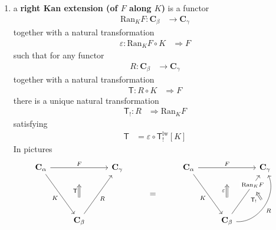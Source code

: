 \begin{enumerate}
\[\begin{tikzcd}[sep=normal]
  \\
  &
  &
  &
  =
  &
  &
  &
  \\
  &
  \mathbf{C}_{\beta}
  \arrow[swap]{uur}{L}
  &
  &
  &
  &
  \mathbf{C}_{\beta}
  \arrow["\mathrm{Lan}_{K}F" description,near end]{uur}[name=lkf]{}
  \arrow[swap,bend right=60]{uur}[name=any]{L}
  &
  \arrow[swap,from=lkf,to=any,shorten <= 10pt,shorten >= 10pt,Rightarrow]{}{\mathsf{T}_{!}}
\end{tikzcd}
\]
\item[(KE$^{\prime}$)]
a \textbf{right Kan extension (of $F$ along $K$)} is a functor
\begin{align*}
  \mathrm{Ran}_{K}F
  \colon
  \mathbf{C}_{\beta}
  &\rightarrow
  \mathbf{C}_{\gamma}
\end{align*}
together with a natural transformation
\begin{align*}
  \varepsilon
  \colon
  \mathrm{Ran}_{K}F
  \circ
  K
  &\Rightarrow
  F
\end{align*}
such that for any functor
\begin{align*}
  R
  \colon
  \mathbf{C}_{\beta}
  &\rightarrow
  \mathbf{C}_{\gamma}
\end{align*}
together with a natural transformation
\begin{align*}
  \mathsf{T}
  \colon
  R
  \circ
  K
  &\Rightarrow
  F
\end{align*}
there is a unique natural transformation
\begin{align*}
  \mathsf{T}_{!}
  \colon
  R
  &\Rightarrow
  \mathrm{Ran}_{K}F
\end{align*}
satisfying
\begin{align*}
  \mathsf{T}
  &=
  \varepsilon
  \circ
  \mathsf{T}_{!}^{\mathrm{lw}}[K]
\end{align*}
In pictures
\[
\begin{tikzcd}[sep=normal]
  \mathbf{C}_{\alpha}
  \arrow{rr}[name=f1]{F}
  \arrow[swap]{ddr}{K}
  &
  &
  \mathbf{C}_{\gamma}
  &
  &
  \mathbf{C}_{\alpha}
  \arrow{rr}[name=f2]{F}
  \arrow[swap]{ddr}{K}
  &
  &
  \mathbf{C}_{\gamma}
  \\
  &
  &
  &
  =
  &
  &
  &
  \\
  &
  \mathbf{C}_{\beta}
  \arrow[to=f1,shorten <= 20pt,shorten >= 20pt,Rightarrow]{uu}{\mathsf{T}}
  \arrow[swap]{uur}{R}
  &
  &
  &
  &
  \mathbf{C}_{\beta}
  \arrow[to=f2,shorten <= 20pt,shorten >= 20pt,Rightarrow]{uu}{\varepsilon}
  \arrow["\mathrm{Ran}_{K}F" description,near end]{uur}[name=rkf]{}
  \arrow[swap,bend right=60]{uur}[name=any]{R}
  &
  \arrow[from=any,to=rkf,shorten <= 10pt,shorten >= 10pt,Rightarrow]{}{\mathsf{T}_{!}}
\end{tikzcd}
\]
\end{enumerate}
